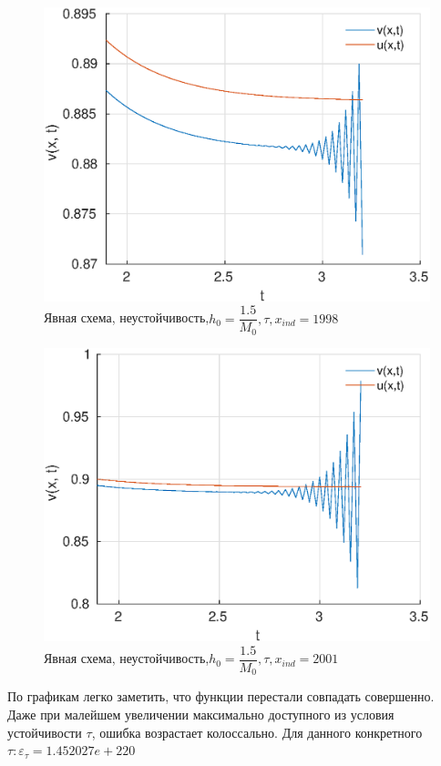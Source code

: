 \documentclass[12pt]{article}
\begin{document}
\begin{enumerate}
\begin{figure}[H]
\centerline{\includegraphics[scale = 0.7]{instable_x=1998.eps}}
\caption{Явная схема, неустойчивость,$h_0 = \dfrac{1.5}{M_0}, \tau, x_{ind} = 1998$}
\end{figure} 

\begin{figure}[H]
\centerline{\includegraphics[scale = 0.7]{instable_x=2001.eps}}
\caption{Явная схема, неустойчивость,$h_0 = \dfrac{1.5}{M_0}, \tau, x_{ind} = 2001$}
\end{figure} 

По графикам легко заметить, что функции перестали совпадать совершенно. Даже при малейшем  увеличении максимально доступного из условия устойчивости $\tau$, ошибка возрастает колоссально. Для данного конкретного $\tau: \varepsilon_{\tau} = 1.452027e+220$
 
\end{enumerate}
\end{document}
